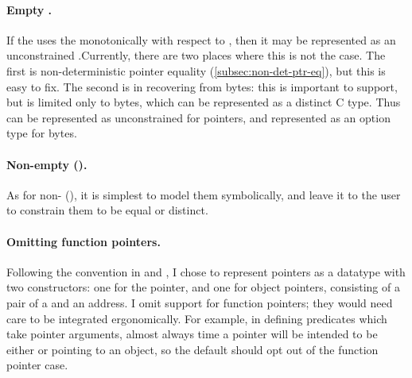 \paragraph{Empty .}%
If the  uses the  
monotonically with respect to , then it may be represented
as an unconstrained .\@ Currently, there are two places where
this is not the case. The first is non-deterministic pointer equality
(\cref{subsec:non-det-ptr-eq}), but this is easy to fix. The second is in
recovering  from bytes: this is important to support, but is
limited only to bytes, which can be represented as a distinct C type. Thus
  can be represented as unconstrained
 for pointers, and represented as an option type for bytes.


\paragraph{Non-empty  ().}%
As for non-  (), it is
simplest to model them symbolically, and leave it to the user to
constrain them to be equal or distinct.

\paragraph{Omitting function pointers.}%
Following the convention in  and , I chose to represent
pointers as a datatype with two constructors: one for the 
pointer, and one for object pointers, consisting of a pair of a 
and an address. I omit support for function pointers; they would need care to
be integrated ergonomically. For example, in defining predicates which take
pointer arguments, almost always time a pointer will be intended to be either
 or pointing to an object, so the default should opt out of the
function pointer case.

